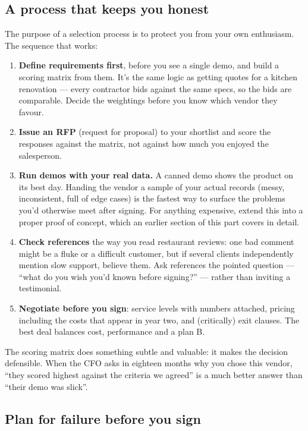 \subsection{A process that keeps you honest}


The purpose of a selection process is to protect you from your own enthusiasm. The sequence that works:


\begin{enumerate}[leftmargin=*]
\item \textbf{Define requirements first}, before you see a single demo, and build a scoring matrix from them. It's the same logic as getting quotes for a kitchen renovation — every contractor bids against the same specs, so the bids are comparable. Decide the weightings before you know which vendor they favour.
\item \textbf{Issue an RFP} (request for proposal) to your shortlist and score the responses against the matrix, not against how much you enjoyed the salesperson.
\item \textbf{Run demos with your real data.} A canned demo shows the product on its best day. Handing the vendor a sample of your actual records (messy, inconsistent, full of edge cases) is the fastest way to surface the problems you'd otherwise meet after signing. For anything expensive, extend this into a proper proof of concept, which an earlier section of this part covers in detail.
\item \textbf{Check references} the way you read restaurant reviews: one bad comment might be a fluke or a difficult customer, but if several clients independently mention slow support, believe them. Ask references the pointed question — ``what do you wish you'd known before signing?'' — rather than inviting a testimonial.
\item \textbf{Negotiate before you sign}: service levels with numbers attached, pricing including the costs that appear in year two, and (critically) exit clauses. The best deal balances cost, performance and a plan B.
\end{enumerate}

The scoring matrix does something subtle and valuable: it makes the decision defensible. When the CFO asks in eighteen months why you chose this vendor, ``they scored highest against the criteria we agreed'' is a much better answer than ``their demo was slick''.



\subsection{Plan for failure before you sign}


